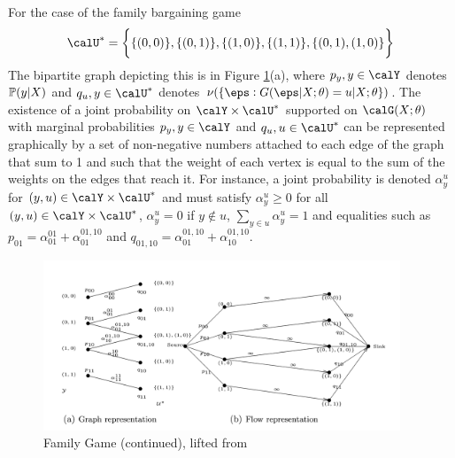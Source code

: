 \begin{example*} For the case of the family bargaining game
\[\calU^* = \bigg\{\{(0,0)\}, \{(0,1)\}, \{(1,0)\}, \{(1,1)\}, \{(0,1),(1,0)\}\bigg\}\]
The bipartite graph depicting this is in Figure \ref{fig:GH-Fig2}(a), where $p_y, y \in \calY$ denotes $\P(y|X)$ and $q_u, y\in \calU^*$ denotes $\nu(\{\eps: G(\eps|X;\theta) = u | X;\theta\})$. The existence of a joint probability on $\calY \times \calU^*$ supported on $\calG(X;\theta)$ with marginal probabilities $p_y, y\in \calY$ and $q_u, u\in \calU^*$ can be represented graphically by a set of non-negative numbers attached to each edge of the graph that sum to 1 and such that the weight of each vertex is equal to the sum of the weights on the edges that reach it. For instance, a joint probability is denoted $\alpha_y^u$ for $(y,u)\in \calY\times\calU^*$ and must satisfy $\alpha_y^u \geq 0$ for all $(y,u)\in \calY\times\calU^*$, $\alpha_y^u = 0$ if $y\not\in u$, $\sum_{y\in u} \alpha_y^u = 1$ and equalities such as $p_{01} = \alpha_{01}^{01} + \alpha_{01}^{01,10}$ and $q_{01,10} = \alpha_{01}^{01,10} + \alpha_{10}^{01,10}$.

\begin{figure}[htb!]
	\centering
	\includegraphics[width=0.95\textwidth]{figures/GH-Fig2.png}
	\caption{Family Game (continued), lifted from \citet{GH-2011}}
	\label{fig:GH-Fig2}
\end{figure}

\end{example*}
 

